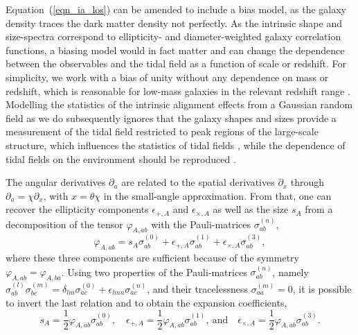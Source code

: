 \documentclass[a4paper,fleqn,usenatbib]{mnras}
\begin{document}
Equation~(\ref{eqn_ia_los}) can be amended to include a bias model, as the galaxy density traces the dark matter density not perfectly. As the intrinsic shape and size-spectra correspond to ellipticity- and diameter-weighted galaxy correlation functions, a biasing model would in fact matter and can change the dependence between the observables and the tidal field as a function of scale or redshift. For simplicity, we work with a bias of unity without any dependence on mass or redshift, which is reasonable for low-mass galaxies in the relevant redshift range \citep{sheth_large-scale_1999}. Modelling the statistics of the intrinsic alignment effects from a Gaussian random field as we do subsequently ignores that the galaxy shapes and sizes provide a measurement of the tidal field restricted to peak regions of the large-scale structure, which influences the statistics of tidal fields \citep{peacock_statistics_1985, schafer_galactic_2012}, while the dependence of tidal fields on the environment should be reproduced \citep{forero-romero_cosmic_2014, reischke_environmental_2018}.

The angular derivatives $\partial_a$ are related to the spatial derivatives $\partial_x$ through $\partial_a = \chi\partial_x$, with $x=\theta\chi$ in the small-angle approximation. From that, one can recover the ellipticity components $\epsilon_{+,A}$ and $\epsilon_{\times,A}$ as well as the size $s_A$ from a decomposition of the tensor $\varphi_{A,ab}$ with the Pauli-matrices $\sigma_{ab}^{(n)}$,
\begin{equation}
\varphi_{A,ab} = s_A\sigma^{(0)}_{ab} + \epsilon_{+,A}\sigma^{(1)}_{ab} + \epsilon_{\times,A}\sigma^{(3)}_{ab},
\end{equation}
where these three components are sufficient because of the symmetry $\varphi_{A,ab} = \varphi_{A,ba}$. Using two properties of the Pauli-matrices $\sigma_{ab}^{(n)}$, namely $\sigma_{ab}^{(l)}\sigma_{bc}^{(m)} = \delta_{lm}\sigma^{(0)}_{ac} + \epsilon_{lmn}\sigma^{(n)}_{ac}$, and their tracelessness $\sigma^{(m)}_{aa} = 0$, it is possible to invert the last relation and to obtain the expansion coefficients,
\begin{equation}
s_A = \frac{1}{2}\varphi_{A,ab}\sigma^{(0)}_{ab},
\quad
\epsilon_{+,A} = \frac{1}{2}\varphi_{A,ab}\sigma^{(1)}_{ab},
\mathrm{~and}\quad
\epsilon_{\times,A} = \frac{1}{2}\varphi_{A,ab}\sigma^{(3)}_{ab}.
\end{equation}
\end{document}
